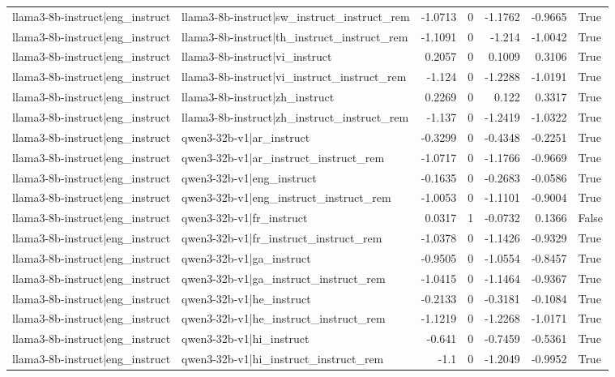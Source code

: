 \begin{table}
\begin{tabular}{l l r r r r l}
llama3-8b-instruct|eng_instruct & llama3-8b-instruct|sw_instruct_instruct_rem & -1.0713 & 0 & -1.1762 & -0.9665 & True \\
llama3-8b-instruct|eng_instruct & llama3-8b-instruct|th_instruct_instruct_rem & -1.1091 & 0 & -1.214 & -1.0042 & True \\
llama3-8b-instruct|eng_instruct & llama3-8b-instruct|vi_instruct & 0.2057 & 0 & 0.1009 & 0.3106 & True \\
llama3-8b-instruct|eng_instruct & llama3-8b-instruct|vi_instruct_instruct_rem & -1.124 & 0 & -1.2288 & -1.0191 & True \\
llama3-8b-instruct|eng_instruct & llama3-8b-instruct|zh_instruct & 0.2269 & 0 & 0.122 & 0.3317 & True \\
llama3-8b-instruct|eng_instruct & llama3-8b-instruct|zh_instruct_instruct_rem & -1.137 & 0 & -1.2419 & -1.0322 & True \\
llama3-8b-instruct|eng_instruct & qwen3-32b-v1|ar_instruct & -0.3299 & 0 & -0.4348 & -0.2251 & True \\
llama3-8b-instruct|eng_instruct & qwen3-32b-v1|ar_instruct_instruct_rem & -1.0717 & 0 & -1.1766 & -0.9669 & True \\
llama3-8b-instruct|eng_instruct & qwen3-32b-v1|eng_instruct & -0.1635 & 0 & -0.2683 & -0.0586 & True \\
llama3-8b-instruct|eng_instruct & qwen3-32b-v1|eng_instruct_instruct_rem & -1.0053 & 0 & -1.1101 & -0.9004 & True \\
llama3-8b-instruct|eng_instruct & qwen3-32b-v1|fr_instruct & 0.0317 & 1 & -0.0732 & 0.1366 & False \\
llama3-8b-instruct|eng_instruct & qwen3-32b-v1|fr_instruct_instruct_rem & -1.0378 & 0 & -1.1426 & -0.9329 & True \\
llama3-8b-instruct|eng_instruct & qwen3-32b-v1|ga_instruct & -0.9505 & 0 & -1.0554 & -0.8457 & True \\
llama3-8b-instruct|eng_instruct & qwen3-32b-v1|ga_instruct_instruct_rem & -1.0415 & 0 & -1.1464 & -0.9367 & True \\
llama3-8b-instruct|eng_instruct & qwen3-32b-v1|he_instruct & -0.2133 & 0 & -0.3181 & -0.1084 & True \\
llama3-8b-instruct|eng_instruct & qwen3-32b-v1|he_instruct_instruct_rem & -1.1219 & 0 & -1.2268 & -1.0171 & True \\
llama3-8b-instruct|eng_instruct & qwen3-32b-v1|hi_instruct & -0.641 & 0 & -0.7459 & -0.5361 & True \\
llama3-8b-instruct|eng_instruct & qwen3-32b-v1|hi_instruct_instruct_rem & -1.1 & 0 & -1.2049 & -0.9952 & True \\

\end{tabular}
\end{table}
